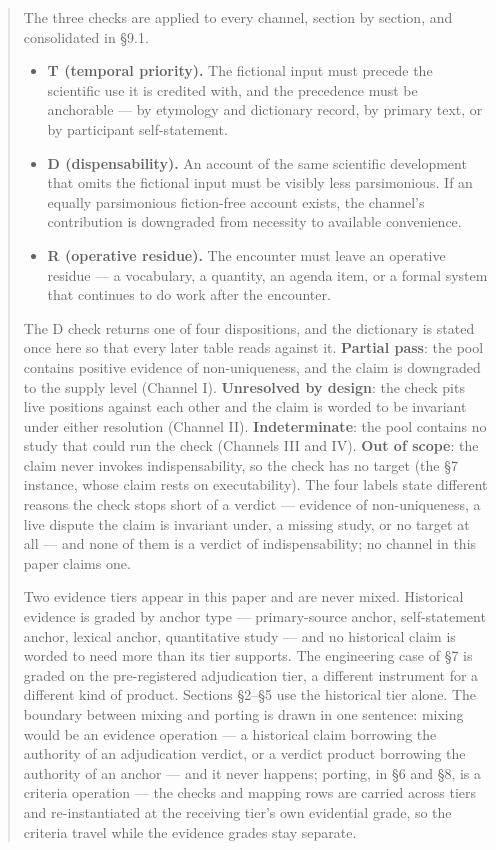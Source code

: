 \documentclass[11pt,a4paper]{article}
\begin{document}
\begin{abstract}
The three checks are applied to every channel, section by section, and consolidated in §9.1.

\begin{itemize}[leftmargin=1.6em,itemsep=2pt,parsep=0pt,topsep=3pt]
\item \textbf{T (temporal priority).} The fictional input must precede the scientific use it is credited with, and the precedence must be anchorable — by etymology and dictionary record, by primary text, or by participant self-statement.
\item \textbf{D (dispensability).} An account of the same scientific development that omits the fictional input must be visibly less parsimonious. If an equally parsimonious fiction-free account exists, the channel's contribution is downgraded from necessity to available convenience.
\item \textbf{R (operative residue).} The encounter must leave an operative residue — a vocabulary, a quantity, an agenda item, or a formal system that continues to do work after the encounter.
\end{itemize}

The D check returns one of four dispositions, and the dictionary is stated once here so that every later table reads against it. \textbf{Partial pass}: the pool contains positive evidence of non-uniqueness, and the claim is downgraded to the supply level (Channel I). \textbf{Unresolved by design}: the check pits live positions against each other and the claim is worded to be invariant under either resolution (Channel II). \textbf{Indeterminate}: the pool contains no study that could run the check (Channels III and IV). \textbf{Out of scope}: the claim never invokes indispensability, so the check has no target (the §7 instance, whose claim rests on executability). The four labels state different reasons the check stops short of a verdict — evidence of non-uniqueness, a live dispute the claim is invariant under, a missing study, or no target at all — and none of them is a verdict of indispensability; no channel in this paper claims one.

Two evidence tiers appear in this paper and are never mixed. Historical evidence is graded by anchor type — primary-source anchor, self-statement anchor, lexical anchor, quantitative study — and no historical claim is worded to need more than its tier supports. The engineering case of §7 is graded on the pre-registered adjudication tier, a different instrument for a different kind of product. Sections §2–§5 use the historical tier alone. The boundary between mixing and porting is drawn in one sentence: mixing would be an evidence operation — a historical claim borrowing the authority of an adjudication verdict, or a verdict product borrowing the authority of an anchor — and it never happens; porting, in §6 and §8, is a criteria operation — the checks and mapping rows are carried across tiers and re-instantiated at the receiving tier's own evidential grade, so the criteria travel while the evidence grades stay separate.


\end{abstract}
\end{document}

